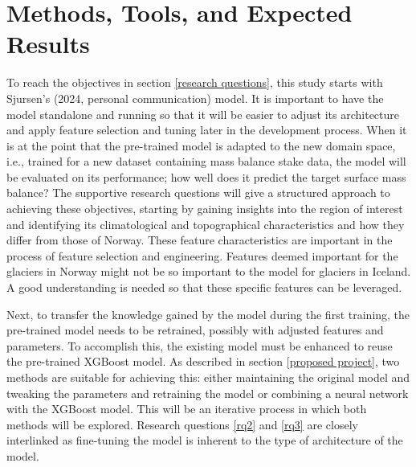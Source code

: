 \section{Methods, Tools, and Expected Results}\label{methodologies}


To reach the objectives in section \ref{research questions}, this study starts with Sjursen's (2024, personal communication) model. It is important to have the model standalone and running so that it will be easier to adjust its architecture and apply feature selection and tuning later in the development process.  When it is at the point that the pre-trained model is adapted to the new domain space, i.e., trained for a new dataset containing mass balance stake data, the model will be evaluated on its performance; how well does it predict the target surface mass balance? The supportive research questions will give a structured approach to achieving these objectives, starting by gaining insights into the region of interest and identifying its climatological and topographical characteristics and how they differ from those of Norway.  These feature characteristics are important in the process of feature selection and engineering. Features deemed important for the glaciers in Norway might not be so important to the model for glaciers in Iceland. A good understanding is needed so that these specific features can be leveraged. 

Next, to transfer the knowledge gained by the model during the first training, the pre-trained model needs to be retrained, possibly with adjusted features and parameters. To accomplish this, the existing model must be enhanced to reuse the pre-trained XGBoost model. As described in section \ref{proposed project}, two methods are suitable for achieving this: either maintaining the original model and tweaking the parameters and retraining the model or combining a neural network with the XGBoost model.  This will be an iterative process in which both methods will be explored. Research questions \ref{rq2} and \ref{rq3} are closely interlinked as fine-tuning the model is inherent to the type of architecture of the model.

